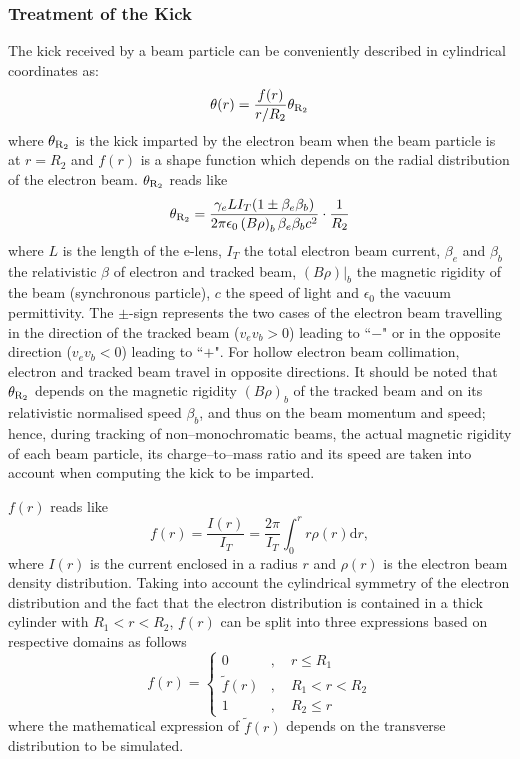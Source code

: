 \documentclass[english]{article}
\begin{document}
\subsubsection{Treatment of the Kick}
The kick received by a beam particle can be conveniently described in cylindrical coordinates as:
\begin{equation}
  \theta(r)=\frac{f(r)}{r/R_2} \theta_{\rm R_2}
  \label{elense:eqn:0}
\end{equation}
where $\theta_{\rm R_2}$ is the kick imparted by the electron beam when the beam particle
is at $r=R_2$ and $f(r)$ is a shape function which depends on the radial distribution of the
electron beam.
$\theta_{\rm R_2}$ reads like
\begin{equation}
\theta_{\rm R_2} = \frac{\gamma_eLI_T(1\pm\beta_e\beta_b)}{2\pi\epsilon_0  \left(B\rho\right)_b\beta_e\beta_b c^2}\cdot\frac{1}{R_2}
\label{elense:eqn:6}
\end{equation}
where $L$ is the length of the e-lens, $I_T$ the total electron beam current, $\beta_{e}$ and $\beta_{b}$ the relativistic $\beta$ of electron and tracked beam, $(B\rho)|_b$ the magnetic rigidity of the beam (synchronous particle), $c$ the speed of light and $\epsilon_0$ the vacuum permittivity. The $\pm$-sign represents the two cases of the electron beam travelling in the direction of the tracked beam ($v_e v_b>0$) leading to ``$-$" or in the opposite direction ($v_e v_b<0$) leading to ``$+$". For hollow electron beam collimation, electron and tracked beam travel in opposite directions. It should be noted that $\theta_{\rm R_2}$ depends on the magnetic rigidity $(B\rho)_b$ of the tracked beam and on its relativistic normalised speed $\beta_b$, and thus on the beam momentum and speed; hence, during tracking of non--monochromatic beams, the actual magnetic rigidity of each beam particle, its charge--to--mass ratio and its speed are taken into account when computing the kick to be imparted.

$f(r)$ reads like
\begin{equation}
  f(r) = \frac{I(r)}{I_T}=\frac{2\pi}{I_T}\int_{0}^r r\rho(r) \mathrm{d}r,
  \label{elense:eqn:1}
\end{equation}
where $I(r)$ is the current enclosed in a radius
$r$ and $\rho(r)$ is the electron beam density distribution. Taking into account the
cylindrical symmetry of the electron distribution and the fact that the electron
distribution is contained in a thick cylinder with $R_1<r<R_2$,
$f(r)$ can be split into
three expressions based on respective domains as follows
\begin{equation}
f(r) =
\begin{cases} 0 &,\quad r \leq R_1\\
\tilde f(r) &,\quad R_1 < r < R_2\\
1 &,\quad R_2 \leq r
\end{cases}
\label{elense:eqn:5}
\end{equation}
where the mathematical expression of $\tilde f(r)$ depends on the transverse
distribution to be simulated.
\end{document}
